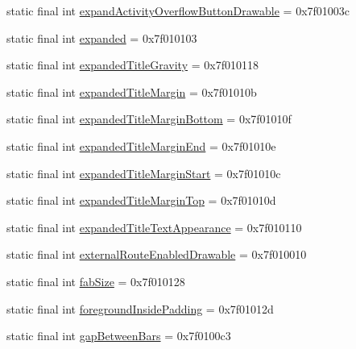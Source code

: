 \begin{CompactItemize}
static final int \hyperlink{classandroid_1_1support_1_1v7_1_1appcompat_1_1_r_1_1attr_1025bf90b03398fd3b4aac2f7d219458}{expandActivityOverflowButtonDrawable} = 0x7f01003c
\item 
static final int \hyperlink{classandroid_1_1support_1_1v7_1_1appcompat_1_1_r_1_1attr_4b5163ce9ec708e3c7b8a21e8e239d5c}{expanded} = 0x7f010103
\item 
static final int \hyperlink{classandroid_1_1support_1_1v7_1_1appcompat_1_1_r_1_1attr_4346f3da5daffd8d364591931416c3bf}{expandedTitleGravity} = 0x7f010118
\item 
static final int \hyperlink{classandroid_1_1support_1_1v7_1_1appcompat_1_1_r_1_1attr_7b18f676eb52d86fcf470e656fe7d678}{expandedTitleMargin} = 0x7f01010b
\item 
static final int \hyperlink{classandroid_1_1support_1_1v7_1_1appcompat_1_1_r_1_1attr_c5b5760b7a9f8cdd1bbc860726218448}{expandedTitleMarginBottom} = 0x7f01010f
\item 
static final int \hyperlink{classandroid_1_1support_1_1v7_1_1appcompat_1_1_r_1_1attr_c558bd3fec395c8cae76d1be72dcd3eb}{expandedTitleMarginEnd} = 0x7f01010e
\item 
static final int \hyperlink{classandroid_1_1support_1_1v7_1_1appcompat_1_1_r_1_1attr_2472836b522ff436d8f596b7e856f2e9}{expandedTitleMarginStart} = 0x7f01010c
\item 
static final int \hyperlink{classandroid_1_1support_1_1v7_1_1appcompat_1_1_r_1_1attr_cab3b1e1937d272772d409b549fd9db7}{expandedTitleMarginTop} = 0x7f01010d
\item 
static final int \hyperlink{classandroid_1_1support_1_1v7_1_1appcompat_1_1_r_1_1attr_1949e9aead5fff7c76f6cd107de571f4}{expandedTitleTextAppearance} = 0x7f010110
\item 
static final int \hyperlink{classandroid_1_1support_1_1v7_1_1appcompat_1_1_r_1_1attr_59eaff27ec0aac94fec6b75a21249a01}{externalRouteEnabledDrawable} = 0x7f010010
\item 
static final int \hyperlink{classandroid_1_1support_1_1v7_1_1appcompat_1_1_r_1_1attr_d10f28134228706c7f5aea6fce361a8a}{fabSize} = 0x7f010128
\item 
static final int \hyperlink{classandroid_1_1support_1_1v7_1_1appcompat_1_1_r_1_1attr_2bb179bcdaffc9a82f6ae547200dc637}{foregroundInsidePadding} = 0x7f01012d
\item 
static final int \hyperlink{classandroid_1_1support_1_1v7_1_1appcompat_1_1_r_1_1attr_ea2f8275f2102d3d220158e4de654aa0}{gapBetweenBars} = 0x7f0100c3
\item 

\end{CompactItemize}
